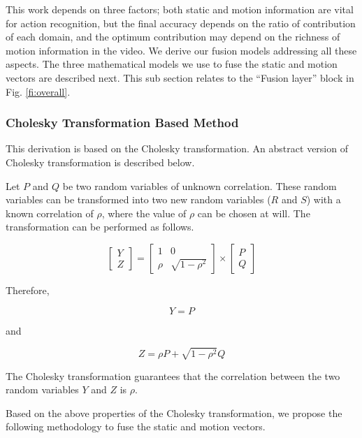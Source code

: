 
This work depends on three factors; both static and motion information
are vital for action recognition, but the final accuracy depends on the ratio of contribution of each domain,
and the optimum contribution may depend on the richness of motion information in the video. We derive our fusion models addressing all these aspects.
The three mathematical models we use
to fuse the static and motion vectors are described next. This sub section relates to the ``Fusion layer'' block in Fig. \ref{fi:overall}.

\subsubsection{Cholesky Transformation Based Method}

This derivation is based on the Cholesky transformation. An
abstract version of Cholesky transformation is described below.

Let $P$ and $Q$ be two random variables of unknown correlation. These random variables can be
transformed into two new random variables ($R$ and $S$) with a known correlation of $\rho$, where the
value of $\rho$ can be chosen at will. The transformation can be performed as follows.

\begin{equation}
\begin{bmatrix}
    Y     \\
    Z
\end{bmatrix}
=
\begin{bmatrix}
    1  & 0 \\
    \rho  & \sqrt{1-\rho^2}
\end{bmatrix}
\times
\begin{bmatrix}
    P     \\
    Q
\end{bmatrix}
\end{equation}

Therefore,

\begin{equation}
Y = P
\end{equation}

and

\begin{equation}
Z = \rho P + \sqrt{1-\rho^2}Q
\end{equation}

The Cholesky transformation guarantees that the correlation between the two random variables
$Y$ and $Z$ is $\rho$.

Based on the above properties of the Cholesky transformation, we propose the following methodology to fuse the static and motion vectors.

